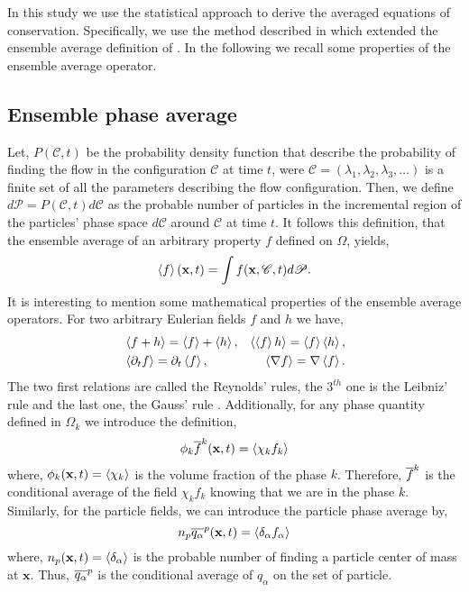 In this study we use the statistical approach to derive the averaged equations of conservation. 
Specifically, we use the method described in \citet{zhang2021ensemble} which extended the ensemble average definition of \citet{batchelor1972sedimentation}. 
In the following we recall some properties of the ensemble average operator. 

\subsection{Ensemble phase average}

Let, $P(\mathscr{C},t)$ be the probability density function that describe the probability of finding the flow in the configuration $\mathscr{C}$ at time $t$, were $\mathscr{C} = (\lambda_1,\lambda_2,\lambda_3,\ldots)$ is a finite set of all the parameters describing the flow configuration. 
Then, we define $d\mathscr{P} = P(\mathscr{C},t)d\mathscr{C}$ as the probable number of particles in the incremental region of the particles' phase space $d\mathscr{C}$ around $\mathscr{C}$ at time $t$. 
It follows this definition, that the ensemble average of an arbitrary property $f$ defined on $\Omega$, yields,
\begin{equation}
    \left<f\right>(\textbf{x},t)
    =\int f(\textbf{x},\mathscr{C},t) d\mathscr{P}. 
    \label{eq:avg}
\end{equation}  
It is interesting to mention some mathematical properties of the ensemble average operators. 
For two arbitrary Eulerian fields $f$ and $h$ we have,
\begin{align}
    &\left<f+h\right> = \left<f\right>+\left<h\right>, 
    &\left<\left<f\right>h\right> = \left<f\right>\left<h\right>, \nonumber \\
    &\left<\partial_t f\right> 
    = \partial_t\left<f\right>, 
    &\left<\mathbf{\nabla} f\right>
    = \mathbf{\nabla} \left<f\right>. 
    \label{eq:avg_properties}
\end{align}
The two first relations are called the Reynolds' rules, the $3^{th}$ one is the Leibniz' 
rule and the last one, the Gauss' rule \citep{drew1983mathematical}.
Additionally, for any phase quantity defined in $\Omega_k$ we introduce the definition, 
\begin{equation}
    \phi_k\overline{f}^k(\textbf{x},t) = \left<\chi_k f_k\right>
    \label{eq:1_avg}
\end{equation}
where, $\phi_k(\textbf{x},t) = \left<\chi_k\right>$ is the volume fraction of the phase $k$.
Therefore, $\overline{f}^k$ is the conditional average of the field $\chi_k f_k$ knowing that we are in the phase $k$.
Similarly, for the particle fields, we can introduce the particle phase average by,
\begin{equation}
     n_p\overline{q_\alpha}^{p}(\textbf{x},t) = \left<\delta_\alpha f_\alpha\right>
     \label{eq:p_avg}
\end{equation}
where, $n_p(\textbf{x},t) = \left<\delta_\alpha\right>$ is the probable number of finding a particle center of mass at $\textbf{x}$. 
Thus, $\overline{q_\alpha}^{p}$ is the conditional average of $q_\alpha$ on the set of particle. 


